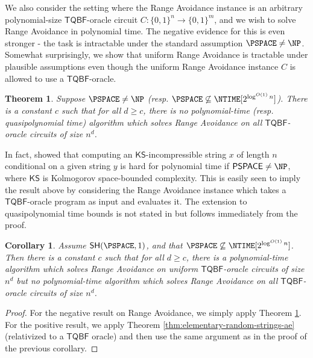 \documentclass[11pt]{article}
\newtheorem{theorem}{Theorem}
\newtheorem{corollary}{Corollary}
\newcommand{\B}{\{0,1\}}
\newcommand{\SH}{\mathsf{SH}}
\begin{document}
We also consider the setting where the Range Avoidance instance is an arbitrary polynomial-size $\mathsf{TQBF}$-oracle circuit $C: \B^n \to \B^m$, and we wish to solve Range Avoidance in polynomial time. The negative evidence for this is even stronger - the task is intractable under the standard assumption $\PSPACE \neq \NP$. Somewhat surprisingly, we show that uniform Range Avoidance is tractable under plausible assumptions even though the uniform Range Avoidance instance $C$ is allowed to use a $\mathsf{TQBF}$-oracle. 

\begin{theorem} \cite{ABK24}
\label{t:PSPACERangeAvoid}
Suppose $\PSPACE \neq \NP$ (resp. $\PSPACE \not\subseteq \NTIME[2^{\log^{O(1)} n}]$).
There is a constant $c$ such that for all $d \geq c$, there is no polynomial-time (resp. quasipolynomial time) algorithm which solves Range Avoidance on all $\mathsf{TQBF}$-oracle circuits of size $n^d$. 
\end{theorem}

In fact, \cite{ABK24} showed that computing an $\mathsf{KS}$-incompressible string $x$ of length $n$ conditional on a given string $y$ is hard for polynomial time if $\mathsf{PSPACE} \neq \NP$, where $\mathsf{KS}$ is Kolmogorov space-bounded complexity. This is easily seen to imply the result above by considering the Range Avoidance instance which takes a $\mathsf{TQBF}$-oracle program as input and evaluates it. The extension to quasipolynomial time bounds is not stated in \cite{ABK24} but follows immediately from the proof.

\begin{corollary}
\label{c:UnifvsNonunifPSPACE}
Assume $\SH(\PSPACE,1)$, and that $\PSPACE \not\subseteq \NTIME[2^{\log^{O(1)} n}]$. Then there is a constant $c$ such that for all $d \geq c$, there is a polynomial-time algorithm which solves Range Avoidance on {\it uniform} $\mathsf{TQBF}$-oracle circuits of size $n^d$ but no polynomial-time algorithm which solves Range Avoidance on all $\mathsf{TQBF}$-oracle circuits of size $n^d$.
\end{corollary}

\begin{proof}
For the negative result on Range Avoidance, we simply apply Theorem \ref{t:PSPACERangeAvoid}. For the positive result, we apply Theorem \ref{thm:elementary-random-strings-ae} (relativized to a $\mathsf{TQBF}$ oracle) and then use the same argument as in the proof of the previous corollary.
\end{proof}
\end{document}
